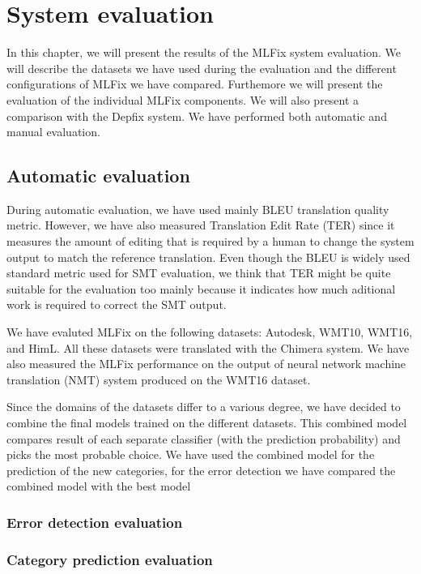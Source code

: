 \chapter{System evaluation}
\label{chap:eval}

In this chapter, we will present the results of the MLFix system evaluation.
We will describe the datasets we have used during the evaluation and the different
configurations of MLFix we have compared. Furthemore we will present the evaluation
of the individual MLFix components.
We will also present a comparison with the Depfix
system. We have performed both automatic and manual evaluation.

\section{Automatic evaluation}

During automatic evaluation, we have used mainly BLEU\cite{papineni:2002} translation quality metric. However, we have also
measured Translation Edit Rate\cite{Snover06astudy} (TER) since it measures the amount of editing that is required by a human
to change the system output to match the reference translation. Even though the BLEU is widely used standard metric
used for SMT evaluation, we think that TER might be quite suitable for the evaluation too mainly because it indicates
how much aditional work is required to correct the SMT output.

We have evaluted MLFix on the following datasets: Autodesk, WMT10, WMT16, and HimL. All these datasets
were translated with the Chimera system. We have also measured the MLFix performance on the output of neural network
machine translation (NMT) system produced on the WMT16 dataset.

Since the domains of the datasets differ to a various degree, we have decided to combine the final models trained
on the different datasets. This combined model
compares result of each separate classifier (with the prediction probability) and picks the most probable choice.
We have used the combined model for the prediction of the new categories, for the error detection we have compared
the combined model with the best model


\subsection{Error detection evaluation}

\subsection{Category prediction evaluation}


